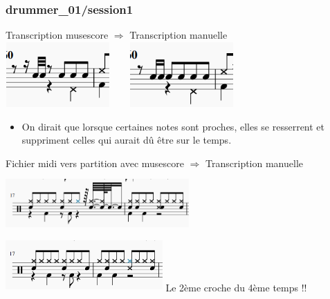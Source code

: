 \subsubsection{drummer\_01/session1}
Transcription musescore $\Rightarrow$ Transcription manuelle\\
\includegraphics[height=25mm, width=40mm]{z_images/4_experimentations/1_analyse_midi_audio/1_drummer1_session1/0_musescore.png}\ \ \ \ 
\includegraphics[height=25mm, width=40mm]{z_images/4_experimentations/1_analyse_midi_audio/1_drummer1_session1/1_manuelle.png}
\begin{itemize}
	\item On dirait que lorsque certaines notes sont proches, elles se resserrent et suppriment celles qui aurait dû être sur le temps.\\
\end{itemize}
Fichier midi vers partition avec musescore $\Rightarrow$ Transcription manuelle\\
\includegraphics[height=25mm, width=70mm]{z_images/4_experimentations/1_analyse_midi_audio/1_drummer1_session1/2_musescore.png}\ \ \ \ 
\includegraphics[height=20mm, width=60mm]{z_images/4_experimentations/1_analyse_midi_audio/1_drummer1_session1/3_manuelle.png}
Le 2ème croche du 4ème temps !!
